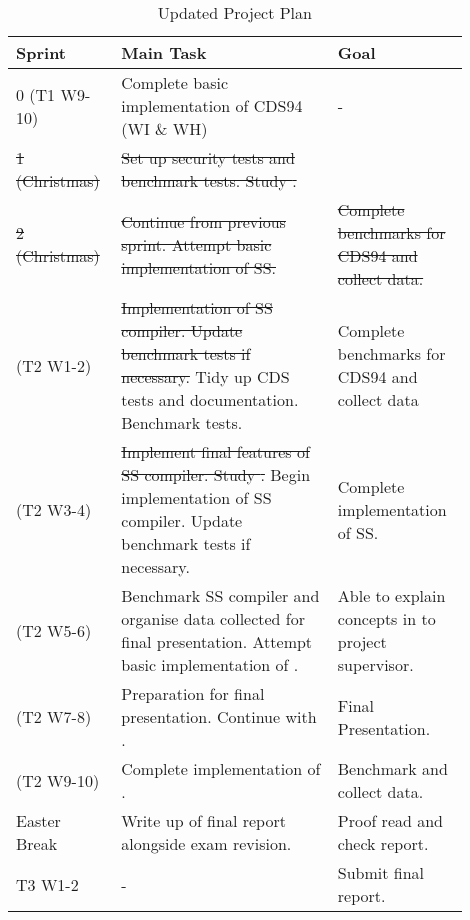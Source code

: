 \begin{table}[H]
\centering
\caption{Updated Project Plan}
\begin{tabular}{p{0.2\linewidth}p{0.45\linewidth}p{0.25\linewidth}}
\toprule
\bf Sprint & \bf Main Task & \bf Goal \\ 
\midrule
0 (T1 W9-10)
& Complete basic implementation of CDS94 (WI \& WH)
& - \\\addlinespace[\rowheight]
\sout{1 (Christmas)}
& \sout{Set up security tests and benchmark tests. Study \cite{StackingSigmas}.}
& \xout{-} \\\addlinespace[\rowheight]
\sout{2 (Christmas)}
& \sout{Continue from previous sprint. Attempt basic implementation of SS.}
& \sout{Complete benchmarks for CDS94 and collect data.} \\\addlinespace[\rowheight]
3 (T2 W1-2)
& \sout{Implementation of SS compiler. Update benchmark tests if necessary.} Tidy up CDS tests and documentation. Benchmark tests. 
& \xout{-} Complete benchmarks for CDS94 and collect data \\\addlinespace[\rowheight]
4 (T2 W3-4)
& \sout{Implement final features of SS compiler. Study \cite{SpeedStacking}.} Begin implementation of SS compiler. Update benchmark tests if necessary.
& Complete implementation of SS. \\\addlinespace[\rowheight]
5 (T2 W5-6)
& Benchmark SS compiler and organise data collected for final presentation. Attempt basic implementation of \cite{SpeedStacking}.
& Able to explain concepts in \cite{SpeedStacking} to project supervisor. \\\addlinespace[\rowheight]
6 (T2 W7-8)
& Preparation for final presentation. Continue with \cite{SpeedStacking}.
& Final Presentation. \\\addlinespace[\rowheight]
7 (T2 W9-10)
& Complete implementation of \cite{SpeedStacking}.
& Benchmark \cite{SpeedStacking} and collect data. \\\addlinespace[\rowheight]
Easter Break
& Write up of final report alongside exam revision.
& Proof read and check report. \\\addlinespace[\rowheight]
T3 W1-2
& -
& Submit final report. \\
\bottomrule
\end{tabular}
\label{table:timetablev2}
\end{table}

